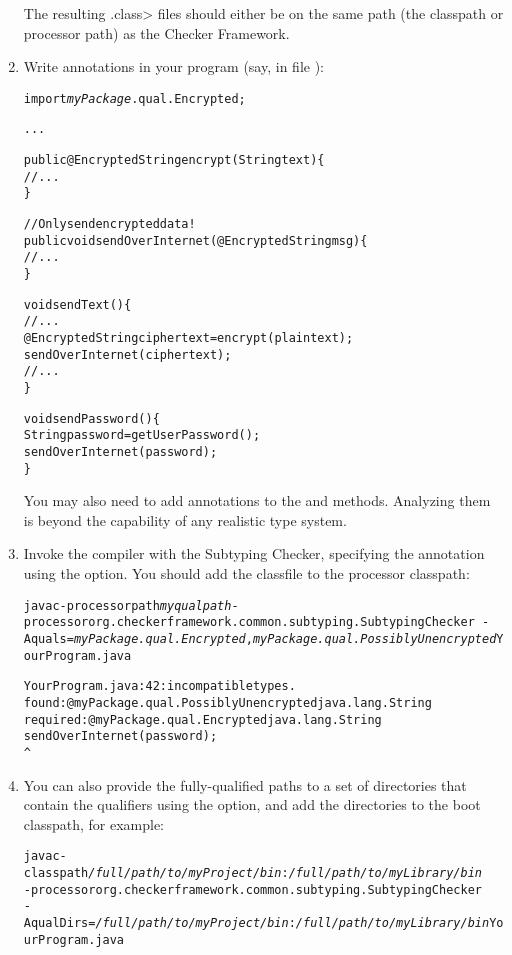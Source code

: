 \begin{enumerate}
The resulting \<.class> files should either be on the same path (the classpath or
processor path) as the Checker Framework.

\item
  Write  annotations in your program (say, in file
  ):

\begin{alltt}
import \textit{myPackage}.qual.Encrypted;

...

public @Encrypted String encrypt(String text) \{
    // ...
\}

// Only send encrypted data!
public void sendOverInternet(@Encrypted String msg) \{
    // ...
\}

void sendText() \{
    // ...
    @Encrypted String ciphertext = encrypt(plaintext);
    sendOverInternet(ciphertext);
    // ...
\}

void sendPassword() \{
    String password = getUserPassword();
    sendOverInternet(password);
\}
\end{alltt}

You may also need to add  annotations to the
 and  methods.  Analyzing them is beyond the
capability of any realistic type system.

\item
  Invoke the compiler with the Subtyping Checker, specifying the
   annotation using the  option.
  You should add the  classfile to the processor classpath:

\begin{alltt}
  javac -processorpath \textit{myqualpath} -processor org.checkerframework.common.subtyping.SubtypingChecker \
        -Aquals=\textit{myPackage.qual.Encrypted},\textit{myPackage.qual.PossiblyUnencrypted} YourProgram.java

YourProgram.java:42: incompatible types.
found   : @myPackage.qual.PossiblyUnencrypted java.lang.String
required: @myPackage.qual.Encrypted java.lang.String
    sendOverInternet(password);
                     ^
\end{alltt}

\item
You can also provide the fully-qualified paths to a set of directories
that contain the qualifiers using the \code{-AqualDirs} option, and add
the directories to the boot classpath, for example:

\begin{alltt}
  javac -classpath \textit{/full/path/to/myProject/bin}:\textit{/full/path/to/myLibrary/bin} \ttbs
        -processor org.checkerframework.common.subtyping.SubtypingChecker \ttbs
        -AqualDirs=\textit{/full/path/to/myProject/bin}:\textit{/full/path/to/myLibrary/bin} YourProgram.java
\end{alltt}


\end{enumerate}
